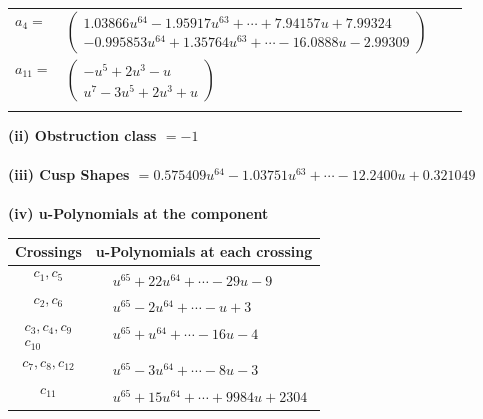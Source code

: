 \documentclass[1p]{elsarticle_modified}
\theoremstyle{definition}
\begin{document}
\begin{tabular}{m{7pt} m{180pt} m{7pt} m{180pt} }
\flushright $a_{4}=$&$\begin{pmatrix}1.03866 u^{64}-1.95917 u^{63}+\cdots+7.94157 u+7.99324\\-0.995853 u^{64}+1.35764 u^{63}+\cdots-16.0888 u-2.99309\end{pmatrix}$ \\
\flushright $a_{11}=$&$\begin{pmatrix}- u^5+2 u^3- u\\u^7-3 u^5+2 u^3+u\end{pmatrix}$\\&\end{tabular}
\flushleft \textbf{(ii) Obstruction class $= -1$}\\~\\
\flushleft \textbf{(iii) Cusp Shapes $= 0.575409 u^{64}-1.03751 u^{63}+\cdots-12.2400 u+0.321049$}\\~\\
\newpage\renewcommand{\arraystretch}{1}
\flushleft \textbf{(iv) u-Polynomials at the component}\newline \\
\begin{tabular}{m{50pt}|m{274pt}}
Crossings & \hspace{64pt}u-Polynomials at each crossing \\
\hline $$\begin{aligned}c_{1},c_{5}\end{aligned}$$&$\begin{aligned}
&u^{65}+22 u^{64}+\cdots-29 u-9
\end{aligned}$\\
\hline $$\begin{aligned}c_{2},c_{6}\end{aligned}$$&$\begin{aligned}
&u^{65}-2 u^{64}+\cdots- u+3
\end{aligned}$\\
\hline $$\begin{aligned}c_{3},c_{4},c_{9}\\c_{10}\end{aligned}$$&$\begin{aligned}
&u^{65}+u^{64}+\cdots-16 u-4
\end{aligned}$\\
\hline $$\begin{aligned}c_{7},c_{8},c_{12}\end{aligned}$$&$\begin{aligned}
&u^{65}-3 u^{64}+\cdots-8 u-3
\end{aligned}$\\
\hline $$\begin{aligned}c_{11}\end{aligned}$$&$\begin{aligned}
&u^{65}+15 u^{64}+\cdots+9984 u+2304
\end{aligned}$\\
\hline
\end{tabular}\\~\\
\end{document}
